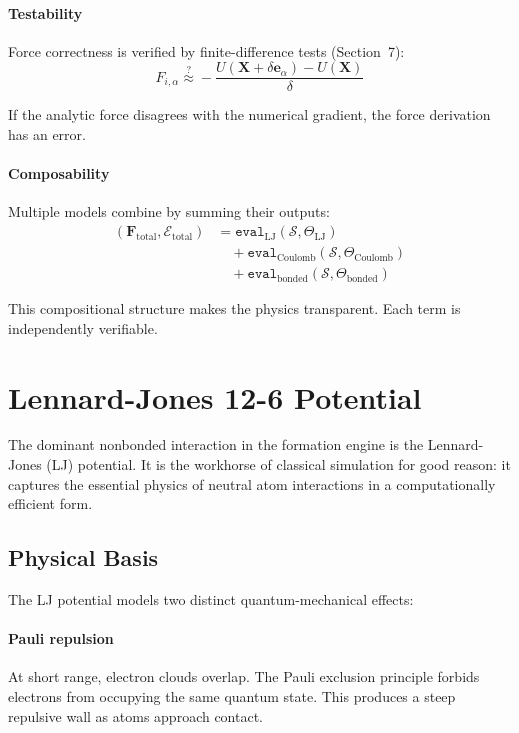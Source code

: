 \documentclass[11pt]{article}
\begin{document}
\paragraph{Testability} Force correctness is verified by finite-difference tests (Section~7):
\begin{equation}
F_{i,\alpha} \stackrel{?}{\approx} -\frac{U(\mathbf{X} + \delta \mathbf{e}_\alpha) - U(\mathbf{X})}{\delta}
\end{equation}

If the analytic force disagrees with the numerical gradient, the force derivation has an error.

\paragraph{Composability} Multiple models combine by summing their outputs:
\begin{align}
(\mathbf{F}_{\text{total}}, \mathcal{E}_{\text{total}}) &= \texttt{eval}_{\text{LJ}}(\mathcal{S}, \Theta_{\text{LJ}}) \\
&\quad + \texttt{eval}_{\text{Coulomb}}(\mathcal{S}, \Theta_{\text{Coulomb}}) \\
&\quad + \texttt{eval}_{\text{bonded}}(\mathcal{S}, \Theta_{\text{bonded}})
\end{align}

This compositional structure makes the physics transparent. Each term is independently verifiable.

\section{Lennard-Jones 12-6 Potential}

The dominant nonbonded interaction in the formation engine is the Lennard-Jones (LJ) potential. It is the workhorse of classical simulation for good reason: it captures the essential physics of neutral atom interactions in a computationally efficient form.

\subsection{Physical Basis}

The LJ potential models two distinct quantum-mechanical effects:

\paragraph{Pauli repulsion} At short range, electron clouds overlap. The Pauli exclusion principle forbids electrons from occupying the same quantum state. This produces a steep repulsive wall as atoms approach contact.
\end{document}
